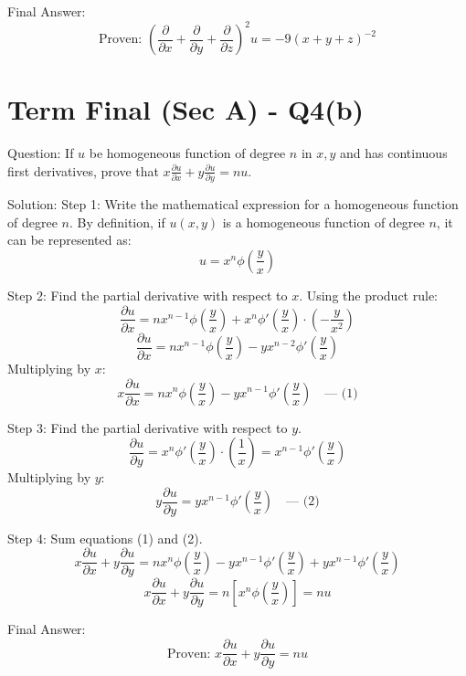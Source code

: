 \documentclass[11pt, a4paper]{article}
\begin{document}
Final Answer:
$$
\boxed{\text{Proven: } \left(\frac{\partial}{\partial x} + \frac{\partial}{\partial y} + \frac{\partial}{\partial z}\right)^2 u = -9(x+y+z)^{-2}}
$$


\section*{Term Final (Sec A) - Q4(b)}
Question:
If $u$ be homogeneous function of degree $n$ in $x, y$ and has continuous first derivatives, prove that $x\frac{\partial u}{\partial x} + y\frac{\partial u}{\partial y} = nu$.

Solution:
Step 1: Write the mathematical expression for a homogeneous function of degree $n$.
By definition, if $u(x, y)$ is a homogeneous function of degree $n$, it can be represented as:
$$u = x^n \phi\left(\frac{y}{x}\right)$$

Step 2: Find the partial derivative with respect to $x$.
Using the product rule:
$$\frac{\partial u}{\partial x} = n x^{n-1} \phi\left(\frac{y}{x}\right) + x^n \phi'\left(\frac{y}{x}\right) \cdot \left(-\frac{y}{x^2}\right)$$
$$\frac{\partial u}{\partial x} = n x^{n-1} \phi\left(\frac{y}{x}\right) - y x^{n-2} \phi'\left(\frac{y}{x}\right)$$
Multiplying by $x$:
$$x \frac{\partial u}{\partial x} = n x^n \phi\left(\frac{y}{x}\right) - y x^{n-1} \phi'\left(\frac{y}{x}\right) \quad \text{--- (1)}$$

Step 3: Find the partial derivative with respect to $y$.
$$\frac{\partial u}{\partial y} = x^n \phi'\left(\frac{y}{x}\right) \cdot \left(\frac{1}{x}\right) = x^{n-1} \phi'\left(\frac{y}{x}\right)$$
Multiplying by $y$:
$$y \frac{\partial u}{\partial y} = y x^{n-1} \phi'\left(\frac{y}{x}\right) \quad \text{--- (2)}$$

Step 4: Sum equations (1) and (2).
$$x \frac{\partial u}{\partial x} + y \frac{\partial u}{\partial y} = n x^n \phi\left(\frac{y}{x}\right) - y x^{n-1} \phi'\left(\frac{y}{x}\right) + y x^{n-1} \phi'\left(\frac{y}{x}\right)$$
$$x \frac{\partial u}{\partial x} + y \frac{\partial u}{\partial y} = n \left[ x^n \phi\left(\frac{y}{x}\right) \right] = nu$$

Final Answer:
$$
\boxed{\text{Proven: } x \frac{\partial u}{\partial x} + y \frac{\partial u}{\partial y} = nu}
$$
\end{document}
